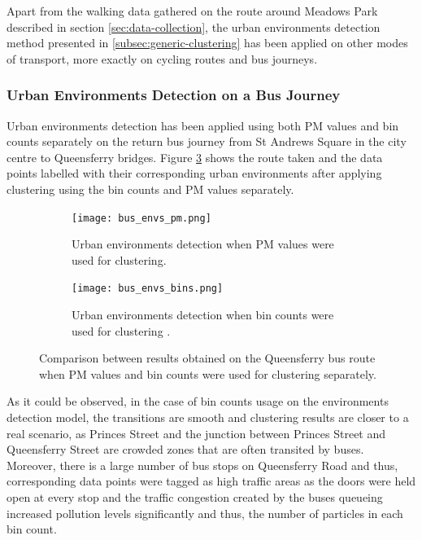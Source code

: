 \documentclass[bsc,frontabs,twoside,singlespacing, parskip,deptreport]{infthesis}     %
\begin{document}
Apart from the walking data gathered on the route around Meadows Park described in section \ref{sec:data-collection}, the urban environments detection method presented in \ref{subsec:generic-clustering} has been applied on other modes of transport, more exactly on cycling routes and bus journeys.

\subsubsection*{Urban Environments Detection on a Bus Journey}

Urban environments detection has been applied using both PM values and bin counts separately on the return bus journey from St Andrews Square in the city centre to Queensferry bridges. Figure \ref{fig:queensferry-urban-environments} shows the route taken and the data points labelled with their corresponding urban environments after applying clustering using the bin counts and PM values separately.

\begin{figure}[h!]
  \begin{subfigure}[t]{\textwidth}
    \texttt{[image: bus\_envs\_pm.png]}
    \caption{Urban environments detection when PM values were used for clustering.}
    \label{fig:queensferry-env-pm}
  \end{subfigure}
  \hfill
  \begin{subfigure}[t]{\textwidth}
    \texttt{[image: bus\_envs\_bins.png]}
    \caption{Urban environments detection when bin counts were used for clustering .}
    \label{fig:queensferry-env-bins}
  \end{subfigure}
  \caption{Comparison between results obtained on the Queensferry bus route when PM values and bin counts were used for clustering separately.}
  \label{fig:queensferry-urban-environments}
\end{figure}

As it could be observed, in the case of bin counts usage on the environments detection model, the transitions are smooth and clustering results are closer to a real scenario, as Princes Street and the junction between Princes Street and Queensferry Street are crowded zones that are often transited by buses. Moreover, there is a large number of bus stops on Queensferry Road and thus, corresponding data points were tagged as high traffic areas as the doors were held open at every stop and the traffic congestion created by the buses queueing increased pollution levels significantly and thus, the number of particles in each bin count.
\end{document}
